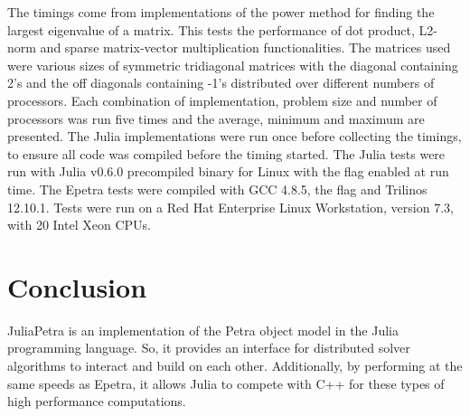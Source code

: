 \documentclass[acmsmall]{acmart}
\newcommand{\juliaSnippet}[1]{\texttt{\detokenize{#1}}}
\begin{document}
The timings come from implementations of the power method for finding the largest eigenvalue of a matrix.
\cite{PowerMethod}
This tests the performance of dot product, L2-norm and sparse matrix-vector multiplication functionalities.
The matrices used were various sizes of symmetric tridiagonal matrices with the diagonal containing 2's
and the off diagonals containing -1's distributed over different numbers of processors.
Each combination of implementation, problem size and number of processors was run five times
and the average, minimum and maximum are presented.
The Julia implementations were run once before collecting the timings, to ensure all code was
compiled before the timing started.
The Julia tests were run with Julia v0.6.0 precompiled binary for Linux
with the \juliaSnippet{-O3} flag enabled at run time.
The Epetra tests were compiled with GCC 4.8.5, the \juliaSnippet{-O3} flag and Trilinos 12.10.1.
Tests were run on a Red Hat Enterprise Linux Workstation, version 7.3,
with 20 Intel Xeon CPUs.


\section{Conclusion}

JuliaPetra is an implementation of the Petra object model in the Julia programming language.
So, it provides an interface for distributed solver algorithms to interact and build on each other.
Additionally, by performing at the same speeds as Epetra,
it allows Julia to compete with C++ for these types of high performance computations.


\end{document}
